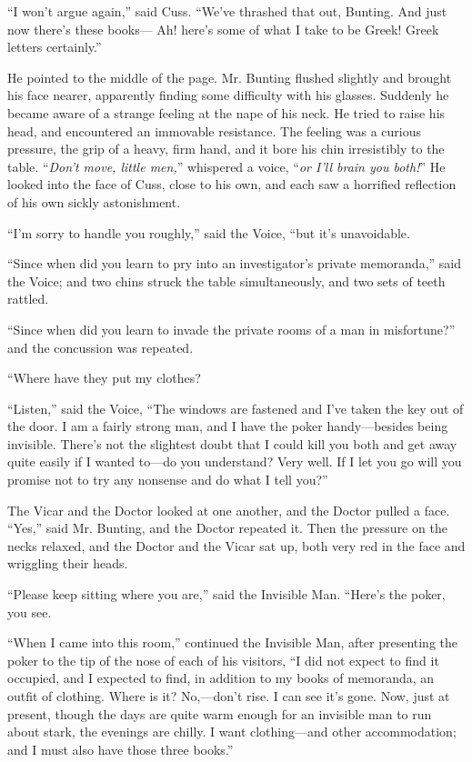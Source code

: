 “I won’t argue again,” said Cuss. “We’ve thrashed that out, Bunting. And just now there’s these books— Ah! here’s some of what I take to be Greek! Greek letters certainly.”

He pointed to the middle of the page. Mr. Bunting flushed slightly and brought his face nearer, apparently finding some difficulty with his glasses. Suddenly he became aware of a strange feeling at the nape of his neck. He tried to raise his head, and encountered an immovable resistance. The feeling was a curious pressure, the grip of a heavy, firm hand, and it bore his chin irresistibly to the table. “\emph{Don’t move, little men,}” whispered a voice, “\emph{or I’ll brain you both!}” He looked into the face of Cuss, close to his own, and each saw a horrified reflection of his own sickly astonishment.

“I’m sorry to handle you roughly,” said the Voice, “but it’s unavoidable.

“Since when did you learn to pry into an investigator’s private memoranda,” said the Voice; and two chins struck the table simultaneously, and two sets of teeth rattled.

“Since when did you learn to invade the private rooms of a man in misfortune?” and the concussion was repeated.

“Where have they put my clothes?

“Listen,” said the Voice, “The windows are fastened and I’ve taken the key out of the door. I am a fairly strong man, and I have the poker handy—besides being invisible. There’s not the slightest doubt that I could kill you both and get away quite easily if I wanted to—do you understand? Very well. If I let you go will you promise not to try any nonsense and do what I tell you?”

The Vicar and the Doctor looked at one another, and the Doctor pulled a face. “Yes,” said Mr. Bunting, and the Doctor repeated it. Then the pressure on the necks relaxed, and the Doctor and the Vicar sat up, both very red in the face and wriggling their heads.

“Please keep sitting where you are,” said the Invisible Man. “Here’s the poker, you see.

“When I came into this room,” continued the Invisible Man, after presenting the poker to the tip of the nose of each of his visitors, “I did not expect to find it occupied, and I expected to find, in addition to my books of memoranda, an outfit of clothing. Where is it? No,—don’t rise. I can see it’s gone. Now, just at present, though the days are quite warm enough for an invisible man to run about stark, the evenings are chilly. I want clothing—and other accommodation; and I must also have those three books.”